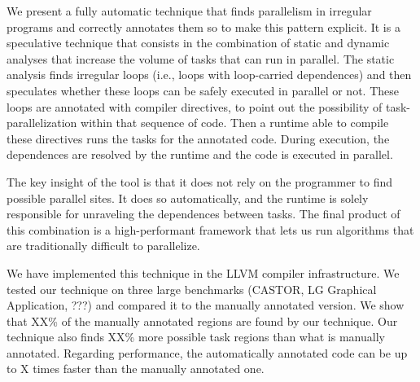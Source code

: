 \documentclass[pageno]{jpaper}
\begin{document}
We present a fully automatic technique that finds parallelism in irregular programs and correctly annotates 
them so to make this pattern explicit.
It is a speculative technique that consists in the combination of static and dynamic analyses that increase 
the volume of tasks that can run in parallel.
The static analysis finds irregular loops (i.e., loops with loop-carried dependences) and then speculates 
whether these loops can be safely executed in parallel or not. These loops
are annotated with compiler directives, to point out the possibility of task-parallelization within that sequence of code. 
Then a runtime able to compile these directives runs the tasks for the annotated code. 
During execution, the dependences are resolved by the runtime and the code is executed in parallel. 

The key insight of the tool is that it does not rely on the programmer to find possible parallel sites. 
It does so automatically, and the runtime is solely responsible for unraveling the dependences between tasks. 
The final product of this combination is a high-performant framework that
lets us run algorithms that are traditionally difficult to parallelize.

We have implemented this technique in the LLVM compiler infrastructure. We tested our technique on three large benchmarks (CASTOR, LG Graphical Application, ???) and compared it to the manually annotated version. We show that XX\% of the manually annotated regions are found by our technique. Our technique also finds XX\% more possible task regions than what is manually annotated. Regarding performance, the automatically annotated code can be up to X times faster than the manually annotated one.


\end{document}
